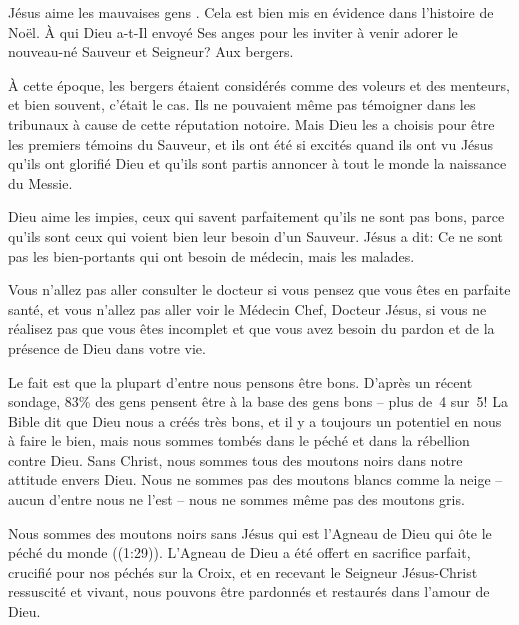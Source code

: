 

Jésus aime les \og mauvaises gens \fg{}. Cela est bien mis en évidence dans l'histoire de Noël. À qui Dieu a-t-Il envoyé Ses anges pour les inviter à venir adorer le nouveau-né Sauveur et Seigneur? Aux bergers.

À cette époque, les bergers étaient considérés comme des voleurs et des menteurs, et bien souvent, c'était le cas. Ils ne pouvaient même pas témoigner dans les tribunaux à cause de cette réputation notoire. Mais Dieu les a choisis pour être les premiers témoins du Sauveur, et ils ont été si excités quand ils ont vu Jésus qu'ils ont glorifié Dieu et qu'ils sont partis annoncer à tout le monde la naissance du Messie.

Dieu aime les impies, ceux qui savent parfaitement qu'ils ne sont pas bons, parce qu'ils sont ceux qui voient bien leur besoin d'un Sauveur. Jésus a dit: \og Ce ne sont pas les bien-portants qui ont besoin de médecin, mais les malades. \fg{}

Vous n'allez pas aller consulter le docteur si vous pensez que vous êtes en parfaite santé, et vous n'allez pas aller voir le Médecin Chef, Docteur Jésus, si vous ne réalisez pas que vous êtes incomplet et que vous avez besoin du pardon et de la présence de Dieu dans votre vie.

Le fait est que la plupart d'entre nous pensons être bons. D'après un récent sondage, 83\% des gens pensent être à la base des gens bons – plus de~4 sur~5! La Bible dit que Dieu nous a créés très bons, et il y a toujours un potentiel en nous à faire le bien, mais nous sommes tombés dans le péché et dans la rébellion contre Dieu. Sans Christ, nous sommes tous des moutons noirs dans notre attitude envers Dieu. Nous ne sommes pas des moutons blancs comme la neige – aucun d'entre nous ne l'est – nous ne sommes même pas des moutons gris.

Nous sommes des moutons noirs sans Jésus qui est \og l'Agneau de Dieu qui ôte le péché du monde \fg{} ((1:29)). L'Agneau de Dieu a été offert en sacrifice parfait, crucifié pour nos péchés sur la Croix, et en recevant le Seigneur Jésus-Christ ressuscité et vivant, nous pouvons être pardonnés et restaurés dans l'amour de Dieu.

